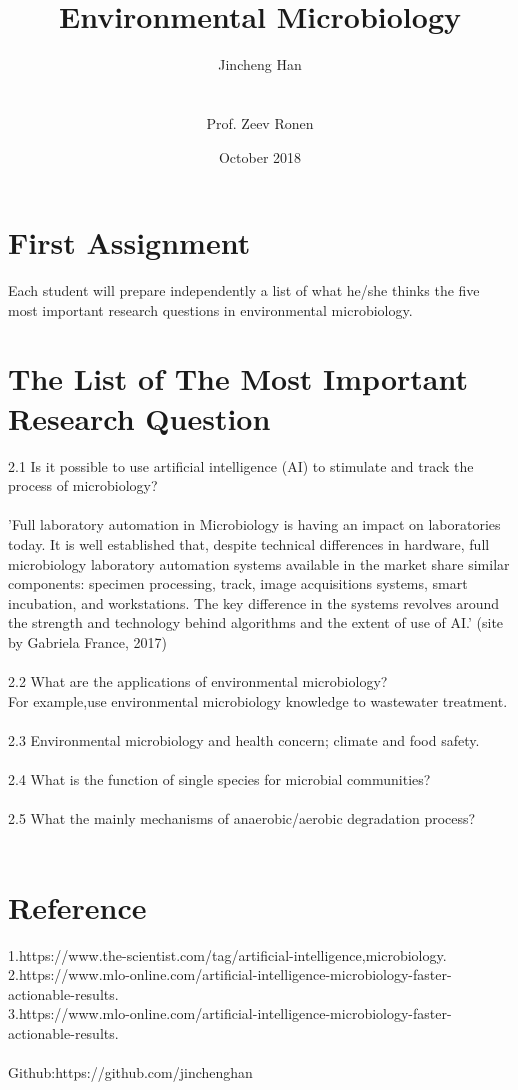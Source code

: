 \documentclass{article}
\title{Environmental Microbiology}
\author{Jincheng Han \\
\\
\\
Prof. Zeev Ronen}
\date{October 2018}
\begin{document}
\maketitle

\section{First Assignment }

Each student will prepare independently a list of what he/she thinks the  five most important research questions in environmental microbiology.

\section {The List of The Most Important Research Question}
2.1 Is it possible to use artificial intelligence (AI) to stimulate and track the process of microbiology? \\
\\
'Full laboratory automation in Microbiology is having an impact on laboratories today. It is well established that, despite technical differences in hardware, full microbiology laboratory automation systems available in the market share similar components: specimen processing, track, image acquisitions systems, smart incubation, and workstations. The key difference in the systems revolves around the strength and technology behind algorithms and the extent of use of AI.' (site by  Gabriela France, 2017) \\
\\
2.2 What are the applications of environmental microbiology?\\
For example,use environmental microbiology  knowledge to wastewater treatment.\\
\\
2.3 Environmental microbiology and health concern; climate and food safety.\\
\\
2.4 What is the function of single species for microbial communities?\\
\\
2.5 What the mainly mechanisms of anaerobic/aerobic degradation process?\\
\\
\section {Reference }
1.https://www.the-scientist.com/tag/artificial-intelligence,microbiology. \\
2.https://www.mlo-online.com/artificial-intelligence-microbiology-faster-actionable-results. \\
3.https://www.mlo-online.com/artificial-intelligence-microbiology-faster-actionable-results.\\
\\
Github:https://github.com/jinchenghan
\end{document}
